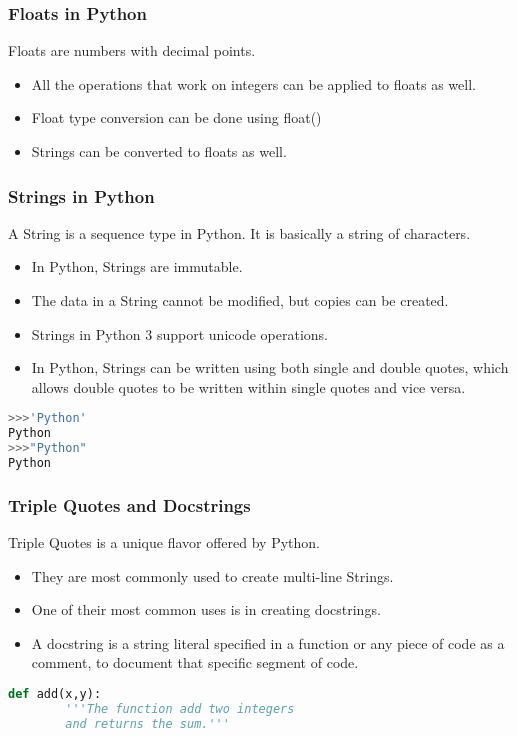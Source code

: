 \documentclass{beamer}
\begin{document}
\begin{frame}
\frametitle{Floats in Python}
Floats are numbers with decimal points. 
\begin{itemize}
\item All the operations that work on integers can be applied to floats as well.
\item Float type conversion can be done using float()
\item Strings can be converted to floats as well.

\end{itemize}
\end{frame}

\begin{frame}[fragile]
\frametitle{Strings in Python}
A String is a sequence type in Python. It is basically a string of characters.
\begin{itemize}
\item In Python, Strings are immutable.
\item The data in a String cannot be modified, but copies can be created.
\item Strings in Python 3 support unicode operations.
\item In Python, Strings can be written using both single and double quotes, which allows  double quotes to be written within single quotes and vice versa.

\end{itemize}
\begin{lstlisting}[language=Python]
>>>'Python'
Python
>>>"Python"
Python
\end{lstlisting}
\end{frame}

\begin{frame}[fragile]
\frametitle{Triple Quotes and Docstrings}
Triple Quotes is a unique flavor offered by Python.
\begin{itemize}
\item They are most commonly used to create multi-line Strings.
\item One of their most common uses is in creating docstrings.
\item A docstring is a string literal specified in a function or any piece of code as a comment, to document that specific segment of code.
 
\end{itemize}

\begin{lstlisting}[language=Python]
	def add(x,y):
		'''The function add two integers
		and returns the sum.'''
\end{lstlisting}
\end{frame}
\end{document}
